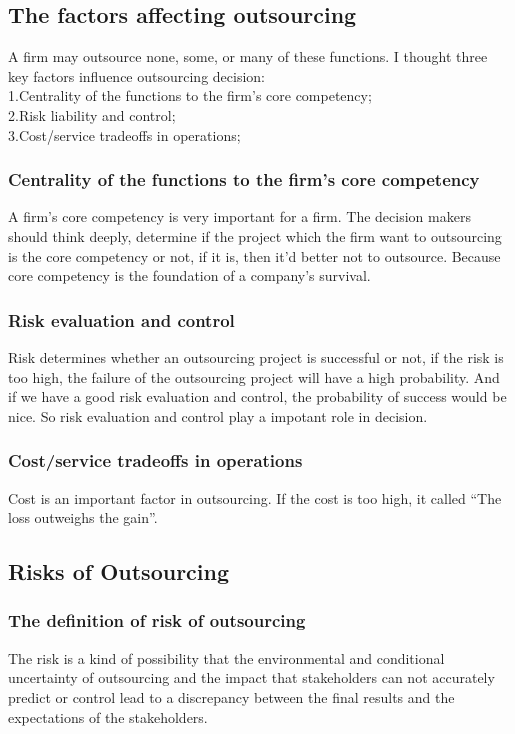\documentclass[twocolumn,UTF8]{article}
\begin{document}
\subsection{The factors affecting outsourcing}
A firm may outsource none, some, or many of these functions. I thought three key factors influence outsourcing decision:\\
\indent 1.Centrality of the functions to the firm's core competency; \\
\indent 2.Risk liability and control; \\
\indent 3.Cost/service tradeoffs in operations; \\

\subsubsection{Centrality of the functions to the firm's core competency}
A firm's core competency is very important for a firm. The decision makers should think deeply, determine if the project which the firm want to outsourcing is the core competency or not, if it is, then it'd better not to outsource. Because core competency is the foundation of a company's survival.

\subsubsection{Risk evaluation and control}
Risk determines whether an outsourcing project is successful or not, if the risk is too high, the failure of the outsourcing project will have a high probability. And if we have a good risk evaluation and control, the probability of success would be nice. So risk evaluation and control play a impotant role in decision.

\subsubsection{Cost/service tradeoffs in operations}
Cost is an important factor in outsourcing. If the cost is too high, it called
\textquotedblleft The loss outweighs the gain\textquotedblright.


\subsection{Risks of Outsourcing}

\subsubsection{The definition of risk of outsourcing}
The risk is a kind of possibility that the environmental and conditional uncertainty of outsourcing and the impact that stakeholders can not accurately predict or control lead to a discrepancy between the final results and the expectations of the stakeholders.
\end{document}
